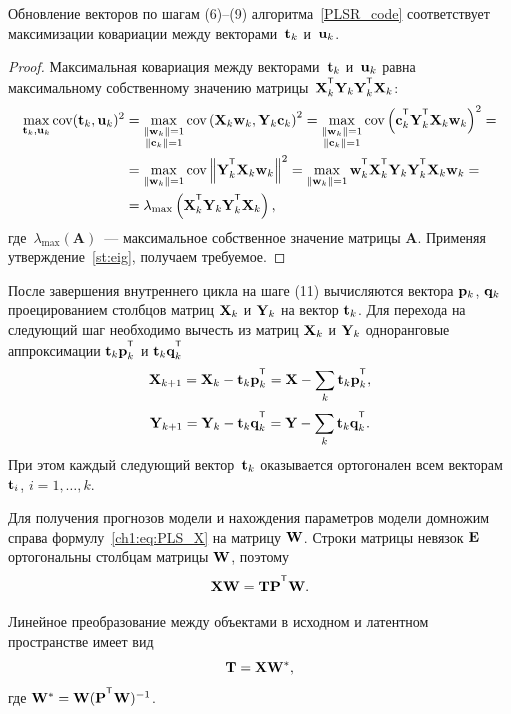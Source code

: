 \begin{statement}
	Обновление векторов по шагам (6)--(9) алгоритма~\ref{PLSR_code} соответствует максимизации ковариации между векторами~$\mathbf{t}_k$ и~$\mathbf{u}_k$.
\end{statement}
\begin{proof}
	Максимальная ковариация между векторами~$\mathbf{t}_k$ и~$\mathbf{u}_k$ равна максимальному собственному значению матрицы~$\bX_k^{\T} \bY_k \bY_k^{\T} \bX_k$:
	\begin{align*}
		\max_{\bt_k, \bu_k}  \text{cov} (\bt_k, \bu_k)^2 &= \max_{\substack{\|\bw_k\|=1 \\ \|\bc_k\| = 1}} \text{cov} \left( \bX_k \bw_k, \bY_k \bc_k \right)^2 = \max_{\substack{\|\bw_k\|=1 \\ \|\bc_k\| = 1}} \text{cov} \left(\bc_k^{\T}  \bY_k^{\T} \bX_k \bw_k \right)^2 = \\
		&= \max_{\|\bw_k\| = 1} \text{cov} \left\|\bY_k^{\T} \bX_k \bw_k \right\|^2 = \max_{\|\bw_k\| = 1} \bw_k^{\T} \bX_k^{\T} \bY_k \bY_k^{\T} \bX_k \bw_k = \\
		& = \lambda_{\max} \left( \bX_k^{\T} \bY_k \bY_k^{\T} \bX_k \right),
	\end{align*}
	где~$\lambda_{\max} (\mathbf{A})$~--- максимальное собственное значение матрицы $\mathbf{A}$.
	Применяя утверждение~\ref{st:eig}, получаем требуемое.
\end{proof}

После завершения внутреннего цикла на шаге (11) вычисляются вектора $\mathbf{p}_k$, $\mathbf{q}_k$ проецированием столбцов матриц $\mathbf{X}_k$ и $\mathbf{Y}_k$ на вектор $\mathbf{t}_k$. 
Для перехода на следующий шаг необходимо вычесть из матриц $\mathbf{X}_k$ и $\mathbf{Y}_k$ одноранговые аппроксимации $\bt_k \bp_k^{\T}$ и $\bt_k \bq_k^{\T}$
\begin{equation*}
	\bX_{k + 1} = \bX_{k} - \bt_k \bp_k^{\T} = \bX - \sum_k \bt_k \bp_k^{\T},
\end{equation*}
\begin{equation*}
	\bY_{k + 1} = \bY_{k} - \bt_k \bq_k^{\T} = \bY - \sum_k \bt_k \bq_k^{\T}.
\end{equation*}
При этом каждый следующий вектор~$\mathbf{t}_k$ оказывается ортогонален всем векторам~$\mathbf{t}_i$, $i=1, \dots, k$.

Для получения прогнозов модели и нахождения параметров модели 
домножим справа формулу~\eqref{ch1:eq:PLS_X} на матрицу $\mathbf{W}$. Строки матрицы невязок $\mathbf{E}$ ортогональны столбцам матрицы $\mathbf{W}$, поэтому 
\[
\bX \bW = \bT \bP^{\T} \bW.
\] 

Линейное преобразование между объектами в исходном и латентном пространстве имеет вид
\begin{equation}
	\mathbf{T} = \mathbf{X} \mathbf{W}^*,
	\label{ch1:eq:W*}
\end{equation}
где $\bW^* = \bW (\bP^{\T} \bW)^{-1}$. 

